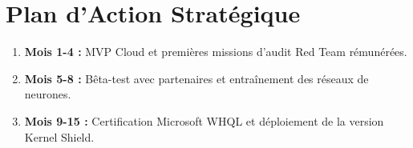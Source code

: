 \documentclass[12pt,a4paper]{article}
\begin{document}
\section{Plan d'Action Stratégique}
\begin{enumerate}
    \item \textbf{Mois 1-4 :} MVP Cloud et premières missions d'audit Red Team rémunérées.
    \item \textbf{Mois 5-8 :} Bêta-test avec partenaires et entraînement des réseaux de neurones.
    \item \textbf{Mois 9-15 :} Certification Microsoft WHQL et déploiement de la version Kernel Shield.
\end{enumerate}
\end{document}
